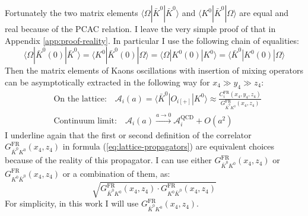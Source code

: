 \documentclass[english, LaM, oneside, noexaminfo]{sapthesis}
\newcommand{\la}{\langle}
\newcommand{\ra}{\rangle}
\begin{document}
Fortunately the two matrix elements $\la \Omega | \bar K^0 | \bar K^0 \ra$ and $\la K^0 | \bar K^0 | \Omega \ra$ are equal and real because of the PCAC relation.
I leave the very simple proof of that in Appendix \ref{app:proof-reality}.
In particular I use the following chain of equalities:
$$\la \Omega | \bar K^0 (0) | \bar K^0 \ra = \la K^0 | \bar K^0 (0) | \Omega \ra = \la \Omega | K^0 (0) | K^0 \ra = \la \bar K^0 | K^0 (0) | \Omega \ra $$
Then the matrix elements of Kaons oscillations with insertion of mixing operators can be asymptotically extracted in the following way for $x_4 \gg y_4 \gg z_4$:
\begin{equation}\label{eq:matrix-elements-extraction}
    \begin{split}
        & \text{On the lattice:} \quad \mathcal{A}_i (a) = \la \bar K^0 | O_{i[+]} | K^0 \ra \approx \frac{C_i^\text{FR} (x_4,y_4,z_4)}{G_{\bar K^0 K^0}^\text{FR}(x_4,z_4)} \\
        & \text{Continuum limit:} \quad \mathcal{A}_i (a) \xrightarrow{a \rightarrow 0} \mathcal{A}_i^\text{QCD} + O(a^2)
    \end{split}
\end{equation}
I underline again that the first or second definition of the correlator $G_{\bar K^0 K^0}^\text{FR}(x_4,z_4)$ in formula (\ref{eq:lattice-propagators}) are equivalent choices because of the reality of this propagator.
I can use either $G_{\bar K^0 K^0}^\text{FR}(x_4,z_4)$ or $G_{K^0 \bar K^0}^\text{FR}(x_4,z_4)$ or a combination of them, as:
\begin{equation*}
    \sqrt{G_{\bar K^0 K^0}^\text{FR}(x_4,z_4) \cdot G_{K^0 \bar K^0}^\text{FR}(x_4,z_4)}
\end{equation*}
For simplicity, in this work I will use $G_{\bar K^0 K^0}^\text{FR}(x_4,z_4)$.

\end{document}
